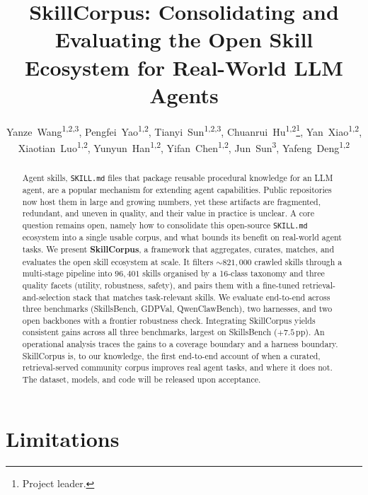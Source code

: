 \documentclass[letterpaper]{article} %
\title{SkillCorpus: Consolidating and Evaluating the Open Skill Ecosystem for Real-World LLM Agents}
\author{
    Yanze~Wang\textsuperscript{\rm 1,2,3}\equalcontrib,
    Pengfei~Yao\textsuperscript{\rm 1,2}\equalcontrib,
    Tianyi~Sun\textsuperscript{\rm 1,2,3},
    Chuanrui~Hu\textsuperscript{\rm 1,2}\footnote{Project leader.},
    Yan~Xiao\textsuperscript{\rm 1,2},
    Xiaotian~Luo\textsuperscript{\rm 1,2},
    Yunyun~Han\textsuperscript{\rm 1,2},
    Yifan~Chen\textsuperscript{\rm 1,2},
    Jun~Sun\textsuperscript{\rm 3}\corresponding,
    Yafeng~Deng\textsuperscript{\rm 1,2}\corresponding
}
\begin{document}
\maketitle

\begin{abstract}
Agent skills, \texttt{SKILL.md} files that package reusable
procedural knowledge for an LLM agent, are a popular
mechanism for extending agent capabilities.  Public
repositories now host them in large and growing numbers, yet these
artifacts are fragmented, redundant, and uneven in quality, and their
value in practice is unclear.  A core
question remains open, namely how to consolidate this open-source
\texttt{SKILL.md} ecosystem into a single usable corpus, and
what bounds its benefit on real-world agent tasks.
We present \textbf{SkillCorpus}, a framework that aggregates,
curates, matches, and evaluates the open skill ecosystem at
scale.  It filters $\sim$$821{,}000$ crawled skills through
a multi-stage pipeline into $96{,}401$ skills
organised by a 16-class taxonomy and three quality facets
(utility, robustness, safety), and pairs them with a fine-tuned
retrieval-and-selection stack that matches task-relevant skills.
We evaluate end-to-end across three benchmarks (SkillsBench,
GDPVal, QwenClawBench), two harnesses, and two open backbones
with a frontier robustness check.
Integrating SkillCorpus yields consistent gains across all
three benchmarks, largest on SkillsBench ($+7.5$\,pp).  An operational
analysis traces the gains to a coverage boundary and a harness
boundary.
SkillCorpus is, to our
knowledge, the first end-to-end account of when a curated,
retrieval-served community corpus improves real agent tasks, and
where it does not.
The dataset, models, and code will be released upon acceptance.
\end{abstract}







\section*{Limitations}
\label{sec:limitations}

\end{document}
